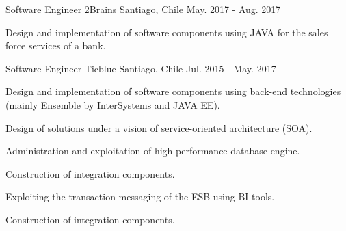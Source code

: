 \begin{cventries}
  \cventry
    {Software Engineer} %
    {2Brains} %
    {Santiago, Chile} %
    {May. 2017 - Aug. 2017} %
    {
      \begin{cvitems} %
        \item {Design and implementation of software components using JAVA for the sales force services of a bank.}
      \end{cvitems}
    }

  \cventry
    {Software Engineer} %
    {Ticblue} %
    {Santiago, Chile} %
    {Jul. 2015 - May. 2017} %
    {
      \begin{cvitems} %
        \item {Design and implementation of software components using back-end technologies (mainly Ensemble by InterSystems and JAVA EE).}
        \item {Design of solutions under a vision of service-oriented architecture (SOA).}
        \item {Administration and exploitation of high performance database engine.}
        \item {Construction of integration components.}
        \item {Exploiting the transaction messaging of the ESB using BI tools.}
        \item {Construction of integration components.}
      \end{cvitems}
    }

\end{cventries}
